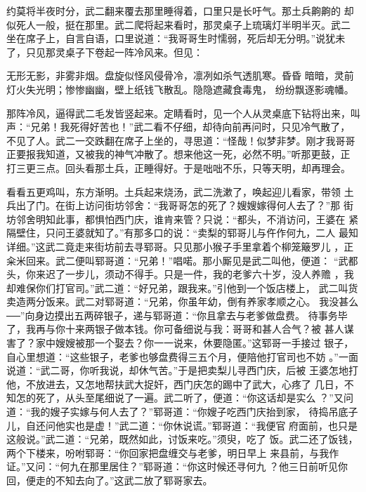 约莫将半夜时分，武二翻来覆去那里睡得着，口里只是长吁气。那土兵齁齁的
却似死人一般，挺在那里。武二爬将起来看时，那灵桌子上琉璃灯半明半灭。武二
坐在席子上，自言自语，口里说道：“我哥哥生时懦弱，死后却无分明。”说犹未
了，只见那灵桌子下卷起一阵冷风来。但见：

无形无影，非雾非烟。盘旋似怪风侵骨冷，凛冽如杀气透肌寒。昏昏
暗暗，灵前灯火失光明；惨惨幽幽，壁上纸钱飞散乱。隐隐遮藏食毒鬼，
纷纷飘逐影魂幡。

那阵冷风，逼得武二毛发皆竖起来。定睛看时，见一个人从灵桌底下钻将出来，叫
声：“兄弟！我死得好苦也！”武二看不仔细，却待向前再问时，只见冷气散了，
不见了人。武二一交跌翻在席子上坐的，寻思道：“怪哉！似梦非梦。刚才我哥哥
正要报我知道，又被我的神气冲散了。想来他这一死，必然不明。”听那更鼓，正
打三更三点。回头看那土兵，正睡得好。于是咄咄不乐，只等天明，却再理会。

看看五更鸡叫，东方渐明。土兵起来烧汤，武二洗漱了，唤起迎儿看家，带领
土兵出了门。在街上访问街坊邻舍：“我哥哥怎的死了？嫂嫂嫁得何人去了？”那
街坊邻舍明知此事，都惧怕西门庆，谁肯来管？只说：“都头，不消访问，王婆在
紧隔壁住，只问王婆就知了。”有那多口的说：“卖梨的郓哥儿与仵作何九，二人
最知详细。”这武二竟走来街坊前去寻郓哥。只见那小猴子手里拿着个柳笼簸罗儿
，正籴米回来。武二便叫郓哥道：“兄弟！”唱喏。那小厮见是武二叫他，便道：
“武都头，你来迟了一步儿，须动不得手。只是一件，我的老爹六十岁，没人养赡
，我却难保你们打官司。”武二道：“好兄弟，跟我来。”引他到一个饭店楼上，
武二叫货卖造两分饭来。武二对郓哥道：“兄弟，你虽年幼，倒有养家孝顺之心。
我没甚么──”向身边摸出五两碎银子，递与郓哥道：“你且拿去与老爹做盘费。
待事务毕了，我再与你十来两银子做本钱。你可备细说与我：哥哥和甚人合气？被
甚人谋害了？家中嫂嫂被那一个娶去？你一一说来，休要隐匿。”这郓哥一手接过
银子，自心里想道：“这些银子，老爹也够盘费得三五个月，便陪他打官司也不妨
。”一面说道：“武二哥，你听我说，却休气苦。”于是把卖梨儿寻西门庆，后被
王婆怎地打他，不放进去，又怎地帮扶武大捉奸，西门庆怎的踢中了武大，心疼了
几日，不知怎的死了，从头至尾细说了一遍。武二听了，便道：“你这话却是实么
？”又问道：“我的嫂子实嫁与何人去了？”郓哥道：“你嫂子吃西门庆抬到家，
待捣吊底子儿，自还问他实也是虚！”武二道：“你休说谎。”郓哥道：“我便官
府面前，也只是这般说。”武二道：“兄弟，既然如此，讨饭来吃。”须臾，吃了
饭。武二还了饭钱，两个下楼来，吩咐郓哥：“你回家把盘缠交与老爹，明日早上
来县前，与我作证。”又问：“何九在那里居住？”郓哥道：“你这时候还寻何九
？他三日前听见你回，便走的不知去向了。”这武二放了郓哥家去。

